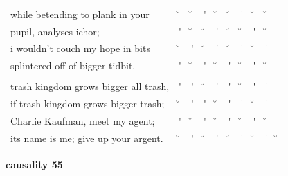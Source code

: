 \documentclass[12pt, landscape]{article}
\begin{document}
\begin{center}
\begin{tabularx}{\textwidth}{
>{\lefting\arraybackslash}X
c
c
c
c
c
c
c
c
c
}

while betending to plank in your & \u{} & \u{} & \'{} & \u{} & \u{} & \'{} & \u{} & \u{} & \\
pupil, analyses ichor; & \'{} & \u{} & \u{} & \'{} & \u{} & \u{} & \'{} & \u{} & \\
i wouldn't couch my hope in bits & \u{} & \'{} & \u{} & \'{} & \u{} & \'{} & \u{} & \'{} & \\
splintered off of bigger tidbit. & \'{} & \u{} & \'{} & \u{} & \'{} & \u{} & \'{} & \u{} & \\
 & & & & & & & & \\
trash kingdom grows bigger all trash, & \'{} & \'{} & \u{} & \'{} & \'{} & \u{} & \'{} & \'{} & \\
if trash kingdom grows bigger trash; & \u{} & \'{} & \'{} & \u{} & \'{} & \'{} & \u{} & \'{} & \\
Charlie Kaufman, meet my agent; & \'{} & \u{} & \'{} & \u{} & \'{} & \u{} & \'{} & \u{} & \\
its name is me; give up your argent. & \u{} & \'{} & \u{} & \'{} & \u{} & \'{} & \u{} & \'{} & \u{} \\

\end{tabularx}
\end{center}

\vspace*{\fill}

\newpage

\vspace*{\fill}

\noindent \textbf{causality 55}
\noindent \hfill \par
\end{document}
